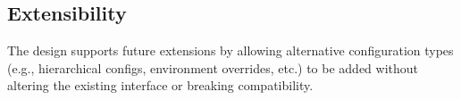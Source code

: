 \subsection{Extensibility}

The design supports future extensions by allowing alternative configuration types (e.g., hierarchical configs, environment overrides, etc.) to be added without altering the existing interface or breaking compatibility.
















